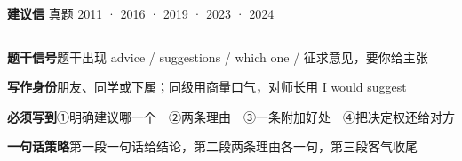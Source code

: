 \documentclass[11pt,a4paper]{ctexart}
\begin{document}
\clearpage
{}\label{g04}
\noindent{\color{accent}\rule{\linewidth}{1.5pt}}\par\vspace{3pt}
\hspace{6pt}
{\LARGE\bfseries 建议信}\hfill
{\footnotesize\color{gray} 真题 2011 · 2016 · 2019 · 2023 · 2024}\par
\vspace{1pt}
{\color{accent!35}\rule{\linewidth}{0.5pt}}\par\vspace{3pt}
{\footnotesize {\color{accent}\bfseries 题干信号}\quad 题干出现 advice / suggestions / which one / 征求意见，要你给主张}\par
{\footnotesize {\color{accent}\bfseries 写作身份}\quad 朋友、同学或下属；同级用商量口气，对师长用 I would suggest}\par
{\footnotesize {\color{accent}\bfseries 必须写到}\quad ①明确建议哪一个　②两条理由　③一条附加好处　④把决定权还给对方}\par
{\footnotesize {\color{accent}\bfseries 一句话策略}\quad 第一段一句话给结论，第二段两条理由各一句，第三段客气收尾}\par
\end{document}
